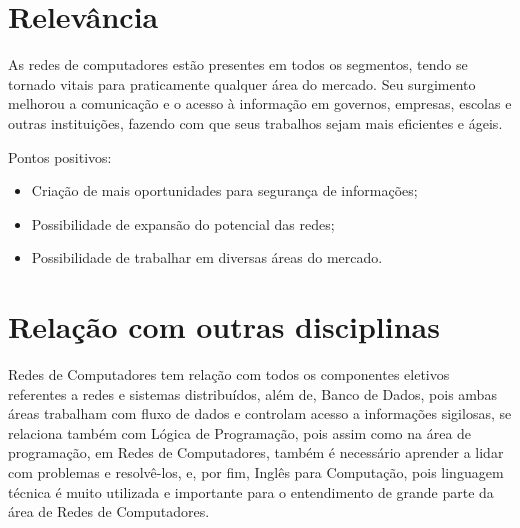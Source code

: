 \documentclass[a4paper,10pt]{article}
\begin{document}
\section{Relevância}
    As redes de computadores estão presentes em todos os segmentos, tendo se tornado vitais para praticamente qualquer área do mercado. Seu surgimento melhorou a comunicação e o acesso à informação em governos, empresas, escolas e outras instituições, fazendo com que seus trabalhos sejam mais eficientes e ágeis.\cite{link4}  
    \\ \par
Pontos positivos:
\begin{itemize}
    \item Criação de mais oportunidades para segurança de informações;
    \item Possibilidade de expansão do potencial das redes;
    \item Possibilidade de trabalhar em diversas áreas do mercado.
\end{itemize}

\section{Relação com outras disciplinas}
    Redes de Computadores tem relação com todos os componentes eletivos referentes a redes e sistemas distribuídos, além de, Banco de Dados, pois ambas áreas trabalham com fluxo de dados e controlam acesso a informações sigilosas, se relaciona também com Lógica de Programação, pois assim como na área de programação, em Redes de Computadores, também é necessário aprender a lidar com problemas e resolvê-los, e, por fim, Inglês para Computação, pois linguagem técnica é muito utilizada e importante para o entendimento de grande parte da área de Redes de Computadores.

\nocite{link1,link5}


\end{document}
